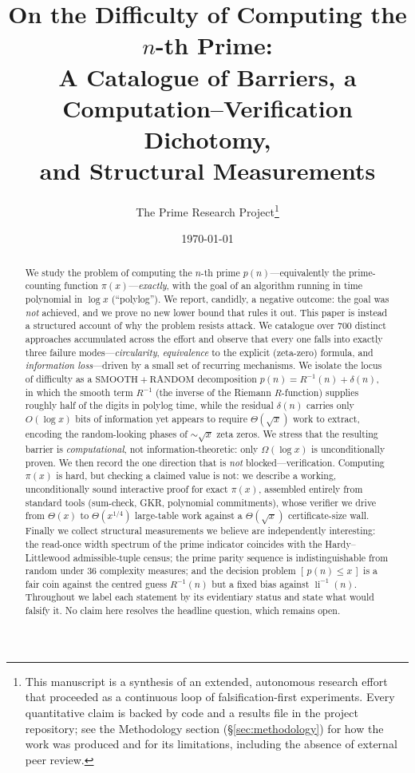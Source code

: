 \documentclass[11pt]{article}
\title{\bfseries On the Difficulty of Computing the $n$-th Prime:\\[2pt]
\large A Catalogue of Barriers, a Computation--Verification Dichotomy,\\
and Structural Measurements}
\author{The Prime Research Project\thanks{This manuscript is a synthesis of an
extended, autonomous research effort that proceeded as a continuous loop of
falsification-first experiments. Every quantitative claim is backed by code and
a results file in the project repository; see the Methodology section
(\S\ref{sec:methodology}) for how the work was produced and for its limitations,
including the absence of external peer review.}}
\date{\today}
\theoremstyle{plain}
\theoremstyle{definition}
\theoremstyle{remark}
\DeclareMathOperator{\li}{li}
\newcommand{\Rinv}{R^{-1}}
\begin{document}
\maketitle

\begin{abstract}
We study the problem of computing the $n$-th prime $p(n)$---equivalently the
prime-counting function $\pi(x)$---\emph{exactly}, with the goal of an algorithm
running in time polynomial in $\log x$ (``polylog''). We report, candidly, a
negative outcome: the goal was \emph{not} achieved, and we prove no new lower
bound that rules it out. This paper is instead a structured account of why the
problem resists attack. We catalogue over $700$ distinct approaches accumulated
across the effort and observe that every one falls into exactly three failure
modes---\emph{circularity}, \emph{equivalence} to the explicit (zeta-zero)
formula, and \emph{information loss}---driven by a small set of recurring
mechanisms. We isolate the locus of difficulty as a $\mathrm{SMOOTH}+\mathrm{RANDOM}$
decomposition $p(n)=\Rinv(n)+\delta(n)$, in which the smooth term $\Rinv$ (the
inverse of the Riemann $R$-function) supplies roughly half of the digits in
polylog time, while the residual $\delta(n)$ carries only $O(\log x)$ bits of
information yet appears to require $\Theta(\sqrt{x})$ work to extract, encoding
the random-looking phases of ${\sim}\sqrt{x}$ zeta zeros. We stress that the
resulting barrier is \emph{computational}, not information-theoretic: only
$\Omega(\log x)$ is unconditionally proven. We then record the one direction that
is \emph{not} blocked---verification. Computing $\pi(x)$ is hard, but checking a
claimed value is not: we describe a working, unconditionally sound interactive
proof for exact $\pi(x)$, assembled entirely from standard tools (sum-check, GKR,
polynomial commitments), whose verifier we drive from $\Theta(x)$ to
$\Theta(x^{1/4})$ large-table work against a $\Theta(\sqrt{x})$ certificate-size
wall. Finally we collect structural measurements we believe are independently
interesting: the read-once width spectrum of the prime indicator coincides with
the Hardy--Littlewood admissible-tuple census; the prime parity sequence is
indistinguishable from random under $36$ complexity measures; and the decision
problem $[\,p(n)\le x\,]$ is a fair coin against the centred guess $\Rinv(n)$ but
a fixed bias against $\li^{-1}(n)$. Throughout we label each statement by its
evidentiary status and state what would falsify it. No claim here resolves the
headline question, which remains open.
\end{abstract}
\end{document}
